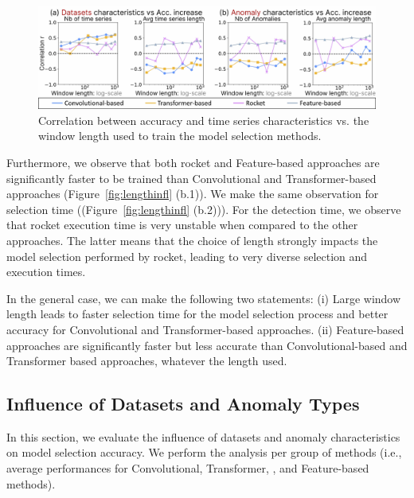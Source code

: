 \begin{figure}
    \includegraphics[width=1.00\linewidth]{figures/9_infl_charac.jpg}
    \vspace{-0.5cm}
    \caption{Correlation between accuracy and time series characteristics vs. the window length used to train the model selection methods.}
    \vspace{-0.3cm}
    \label{fig:infl_charac}
\end{figure}

Furthermore, we observe that both rocket and Feature-based approaches are significantly faster to be trained than Convolutional and Transformer-based approaches (Figure~\ref{fig:lengthinfl} (b.1)). We make the same observation for selection time  ((Figure~\ref{fig:lengthinfl} (b.2))). For the detection time, we observe that rocket execution time is very unstable when compared to the other approaches. The latter means that the choice of length strongly impacts the model selection performed by rocket, leading to very diverse selection and execution times.

In the general case, we can make the following two statements: 
(i) Large window length leads to faster selection time for the model selection process and better accuracy for Convolutional and Transformer-based approaches.
(ii) Feature-based approaches are significantly faster but less accurate than Convolutional-based and Transformer based approaches, whatever the length used.


\vspace{-0.1cm}
\subsection{Influence of Datasets and Anomaly Types}
\label{exp:datasets}

In this section, we evaluate the influence of datasets and anomaly characteristics on model selection accuracy. We perform the analysis per group of methods (i.e., average performances for Convolutional, Transformer, , and Feature-based methods).


